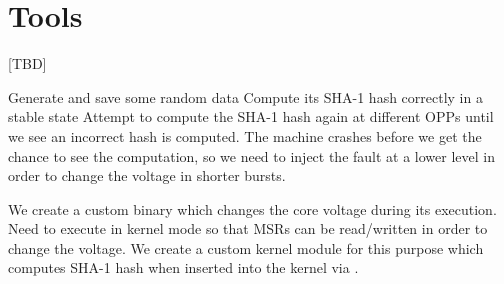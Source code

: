 \section{Tools}

[TBD]

Generate and save some random data
Compute its SHA-1 hash correctly in a stable state
Attempt to compute the SHA-1 hash again at different OPPs until we see an
incorrect hash is computed. The machine crashes before we get the chance to see
the computation, so we need to inject the fault at a lower level in order to
change the voltage in shorter bursts.

We create a custom  binary which changes the core voltage during its
execution.
Need to execute in kernel mode so that MSRs can be read/written in order to
change the voltage.
We create a custom kernel module for this purpose which computes SHA-1 hash
when inserted into the kernel via .
